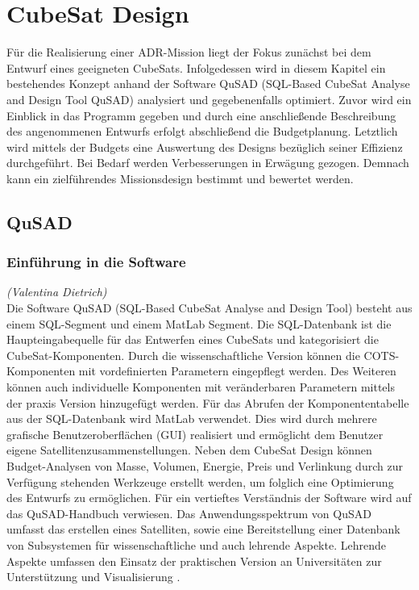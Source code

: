 \chapter{CubeSat Design}

	Für die Realisierung einer ADR-Mission liegt der Fokus zunächst bei dem Entwurf eines geeigneten CubeSats. Infolgedessen wird in diesem Kapitel ein bestehendes Konzept \cite{Lettau.} anhand der Software QuSAD (SQL-Based CubeSat Analyse and Design Tool QuSAD) analysiert und gegebenenfalls optimiert. Zuvor wird ein Einblick in das Programm gegeben und durch eine anschließende Beschreibung des angenommenen Entwurfs erfolgt abschließend die Budgetplanung. Letztlich wird mittels der Budgets eine Auswertung des Designs bezüglich seiner Effizienz durchgeführt. Bei Bedarf werden Verbesserungen in Erwägung gezogen. Demnach kann ein zielführendes Missionsdesign bestimmt und bewertet werden.
		
		\section{QuSAD}
			
			\subsection{Einführung in die Software}
	\hfill\emph{(Valentina Dietrich)}\\
	Die Software QuSAD (SQL-Based CubeSat Analyse and Design Tool) besteht aus einem SQL-Segment und einem MatLab Segment. Die SQL-Datenbank ist die Haupteingabequelle für das Entwerfen eines CubeSats und kategorisiert die CubeSat-Komponenten. Durch die wissenschaftliche Version können die COTS-Komponenten mit vordefinierten Parametern eingepflegt werden. Des Weiteren können auch individuelle Komponenten mit veränderbaren Parametern mittels der praxis Version hinzugefügt werden. Für das Abrufen der Komponententabelle aus der SQL-Datenbank wird MatLab verwendet. Dies wird durch mehrere grafische Benutzeroberflächen (GUI) realisiert und ermöglicht dem Benutzer eigene Satellitenzusammenstellungen. Neben dem CubeSat Design können Budget-Analysen von Masse, Volumen, Energie, Preis und Verlinkung durch zur Verfügung stehenden Werkzeuge erstellt werden, um folglich eine Optimierung des Entwurfs zu ermöglichen. Für ein vertieftes Verständnis der Software wird auf das QuSAD-Handbuch \cite{Farahvashi.2016} verwiesen. Das Anwendungsspektrum von QuSAD umfasst das erstellen eines Satelliten, sowie eine Bereitstellung einer Datenbank von Subsystemen für wissenschaftliche und auch lehrende Aspekte. Lehrende Aspekte umfassen den Einsatz der praktischen Version an Universitäten zur Unterstützung und Visualisierung \cite{Farahvashi.2016b}. 
			
